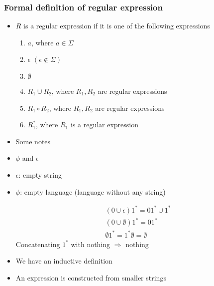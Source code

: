 \begin{frame}[allowframebreaks] \frametitle{Formal definition of regular expression}
\begin{itemize}
\item $R$ is a regular expression if it is one of the following
expressions
\begin{enumerate}
\item $a$, where $a \in \Sigma$
\item $\epsilon$ $(\epsilon \notin \Sigma)$
\item $\emptyset$
\item $R_1 \cup R_2$,  where $R_1, R_2$ are regular expressions
\item $R_1 \circ R_2$, where $R_1, R_2$ are regular expressions
\item $R_1^*$,  where $R_1$ is a regular expression
\end{enumerate}
\item  Some notes
\item $\phi$ and $\epsilon$

\item  [] $\epsilon$: empty string

\item []  $\phi$: empty language (language without any string)

  \begin{equation*}
    \begin{split}
&(0 \cup \epsilon)1^*=01^* \cup 1^* \\
&(0 \cup \emptyset)1^*=01^* \\
&\emptyset 1^* = 1^* \emptyset = \emptyset
\end{split}
\end{equation*}
Concatenating $1^*$ with nothing $\Rightarrow$ nothing

\item We have an inductive definition

\item [] An expression is constructed from smaller strings

\end{itemize}\end{frame}

